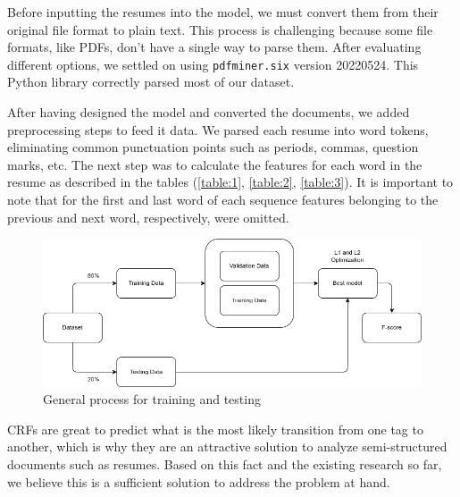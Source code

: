   Before inputting the resumes into the model, we must convert them from their
  original file format to plain text. This process is challenging because some
  file formats, like PDFs, don't have a single way to parse them. After
  evaluating different options, we settled on using \texttt{pdfminer.six}
  version 20220524. This Python library correctly parsed most of our dataset.

  After having designed the model and converted the documents, we added
  preprocessing steps to feed it data. We parsed each resume into word tokens,
  eliminating common punctuation points such as periods, commas, question
  marks, etc. The next step was to calculate the features for each word in the
  resume as described in the tables (\ref{table:1}, \ref{table:2},
  \ref{table:3}). It is important to note that for the first and last word of
  each sequence features belonging to the previous and next word, respectively,
  were omitted.

  \begin{figure}[H]
    \centering
    \includegraphics[width=\columnwidth]{model_training_process.png}
    \caption{%
      General process for training and testing
    }
  \end{figure}

  CRFs are great to predict what is the most likely transition from one
  tag to another, which is why they are an attractive solution to analyze
  semi-structured documents such as resumes. Based on this fact and the
  existing research so far, we believe this is a sufficient solution to address
  the problem at hand.

